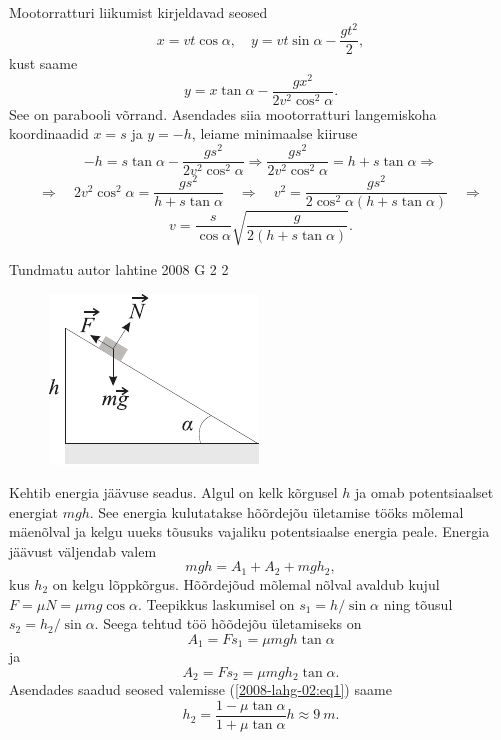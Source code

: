 \documentclass[11pt, twoside]{article}
\begin{document}
{{Mootorratturi liikumist kirjeldavad seosed
\[
x=v t \cos \alpha, \quad y=v t \sin \alpha-\frac{g t^{2}}{2},
\]
kust saame
\[
y=x \tan \alpha-\frac{g x^{2}}{2 v^{2} \cos ^{2} \alpha}.
\]
See on parabooli võrrand. Asendades siia mootorratturi langemiskoha koordinaadid $x = s$ ja $y = -h$, leiame minimaalse kiiruse
\[
-h=s \tan \alpha-\frac{g s^{2}}{2 v^{2} \cos ^{2} \alpha} \Rightarrow \frac{g s^{2}}{2 v^{2} \cos ^{2} \alpha}=h+s \tan \alpha \Rightarrow
\]
\[
\Rightarrow \quad 2 v^{2} \cos ^{2} \alpha=\frac{g s^{2}}{h+s \tan \alpha} \quad \Rightarrow \quad v^{2}=\frac{g s^{2}}{2 \cos ^{2} \alpha(h+s \tan \alpha)} \quad \Rightarrow
\]
\[
v=\frac{s}{\cos \alpha} \sqrt{\frac{g}{2(h+s \tan \alpha)}}.
\]
\fi
}

{Tundmatu autor} %
{lahtine} %
{2008} %
{G 2} %
{2} %
{

\ifSolution
\begin{figure}
	\begin{center}
		\vspace{-25pt}
		\includegraphics[width=0.95\linewidth]{2008-lahg-02-lah}
	\end{center}
\end{figure}
Kehtib energia jäävuse seadus. Algul on kelk kõrgusel $h$ ja omab potentsiaalset energiat $mgh$. See energia kulutatakse hõõrdejõu ületamise tööks mõlemal mäenõlval ja kelgu uueks tõusuks vajaliku potentsiaalse energia peale. Energia jäävust väljendab valem 
\begin{equation} \label{2008-lahg-02:eq1}
mgh= A_1+ A_2+ mgh_2,
\end{equation}
kus $h_2$ on kelgu lõppkõrgus. Hõõrdejõud mõlemal nõlval avaldub kujul $F=\mu N=\mu mg \cos\alpha$. Teepikkus laskumisel on $s_1= h/ \sin\alpha$ ning tõusul $s_2= h_2/ \sin\alpha$. Seega tehtud töö hõõdejõu ületamiseks on
\[
A_1= F s_1=\mu mgh \tan\alpha
\]
ja
\[
A_2= F s_2=\mu mgh_2 \tan\alpha.
\]
Asendades saadud seosed valemisse (\ref{2008-lahg-02:eq1}) saame
\[
h_2= \frac{1 - \mu\tan\alpha}{1 + \mu\tan\alpha}h \approx \SI{9}{m}.
\]
\fi
}

}
\end{document}
